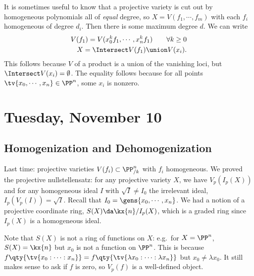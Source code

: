 \begin{remark}

It is sometimes useful to know that a projective variety is cut out by
homogeneous polynomials all of \emph{equal} degree, so
\(X = V (f_1, \cdots, f_m)\) with each \(f_i\) homogeneous of degree
\(d_i\). Then there is some maximum degree \(d\). We can write
\begin{align*}  
V(f_1) = V(x_0^k f_1, \cdots, x_n^k f_1 ) \qquad \forall k\geq 0 \\
X = \Intersect V(f_1) \union V(x_i)
.\end{align*} This follows because \(V\) of a product is a union of the
vanishing loci, but \(\Intersect V(x_i) = \emptyset\). The equality
follows because for all points \(\tv{x_0, \cdots, x_n} \in \PP^n\), some
\(x_i\) is nonzero.

\end{remark}

\hypertarget{tuesday-november-10}{%
\section{Tuesday, November 10}\label{tuesday-november-10}}

\hypertarget{homogenization-and-dehomogenization}{%
\subsection{Homogenization and
Dehomogenization}\label{homogenization-and-dehomogenization}}

Last time: projective varieties \(V(f_i) \subset \PP^n_{/k}\) with
\(f_i\) homogeneous. We proved the projective nullstellensatz: for any
projective variety \(X\), we have \(V_p(I_p(X))\) and for any
homogeneous ideal \(I\) with \(\sqrt{I} \neq I_0\) the irrelevant ideal,
\(I_p(V_p(I)) = \sqrt{I}\). Recall that
\(I_0 = \gens{x_0, \cdots, x_n}\). We had a notion of a projective
coordinate ring, \(S(X) \da \kx{n} / I_p(X)\), which is a graded ring
since \(I_p(X)\) is a homogeneous ideal.

\begin{remark}

Note that \(S(X)\) is not a ring of functions on \(X\): e.g.~for
\(X= \PP^n\), \(S(X) = \kx{n}\) but \(x_0\) is not a function on
\(\PP^n\). This is because
\(f\qty{\tv{x_0: \cdots : x_n}} = f\qty{\tv{\lambda x_0: \cdots : \lambda x_n}}\)
but \(x_0\neq \lambda x_0\). It still makes sense to ask if \(f\) is
zero, so \(V_p(f)\) is a well-defined object.

\end{remark}

